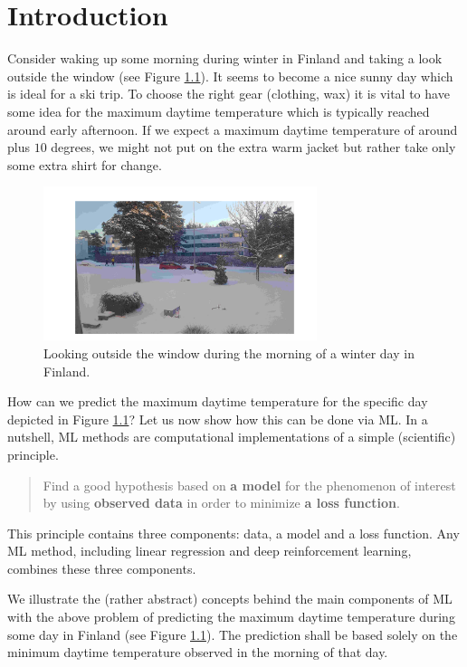 \documentclass[12pt]{report}
\begin{document}

\tableofcontents                        %


\chapter{Introduction}
Consider waking up some morning during winter in Finland 
and taking a look outside the window (see Figure \ref{fig:skiday}). 
It seems to become a nice sunny day which is ideal for a 
ski trip. To choose the right gear (clothing, wax) it is 
vital to have some idea for the maximum daytime temperature 
which is typically reached around early afternoon. If we 
expect a maximum daytime temperature of around plus 
$10$ degrees, we might not put on the extra warm jacket 
but rather take only some extra shirt for change. 


\begin{figure}[htbp]
	\centering
	\includegraphics[width=8cm]{SkiDay2.jpeg}
	\caption{Looking outside the window during the morning of a winter day in Finland.}
	\label{fig:skiday}
\end{figure}

How can we predict the maximum daytime temperature for 
the specific day depicted in Figure \ref{fig:skiday}? Let us now 
show how this can be done via ML. In a nutshell, 
ML methods are computational implementations of a simple 
(scientific) principle. 

\begin{quote}
Find a good hypothesis based on {\bf a model} for the phenomenon of interest by 
using {\bf observed data} in order to minimize {\bf a loss function}. 
\end{quote}

This principle contains three components: data, a model and a 
loss function. Any ML method, including linear 
regression and deep reinforcement learning, combines these 
three components.  

We illustrate the (rather abstract) concepts behind the main 
components of ML with the above problem of predicting the 
maximum daytime temperature during some day in Finland (see Figure \ref{fig:skiday}). 
The prediction shall be based solely on the minimum daytime 
temperature observed in the morning of that day. 
\end{document}
